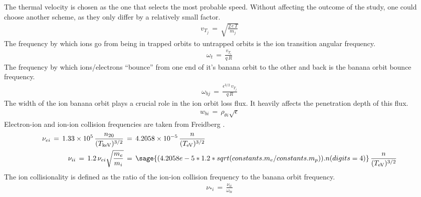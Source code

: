 The thermal velocity is chosen as the one that selects the most probable speed.
Without affecting the outcome of the study, one could choose another scheme, as they only differ by a relatively small factor.
\begin{align} %
	v_{T_j} \,=\, \sqrt{\frac{2 \, e \, T}{m_j}}
		\label{eq:thermal_velocity}
\end{align}
The frequency by which ions go from being in trapped orbits to untrapped orbits is the ion transition angular frequency.
\begin{align} %
	\omega_t \,=\, \frac{v_{T_i}}{q \, R} \label{eq:transition_freq}
\end{align}
The frequency by which ions/electrons ``bounce'' from one end of it's banana orbit to the other and back is the banana orbit bounce frequency.
\begin{align} %
	\omega_{bj} \,=\, \frac{\epsilon^{3/2} \, v_{T_j}}{q \, R}
		\label{eq:banana_bounce_freq}
\end{align}
The width of the ion banana orbit plays a crucial role in the ion orbit loss flux.
It heavily affects the penetration depth of this flux.
\begin{align} %
	w_{bi} \,=\, \rho_{\theta i} \sqrt{\epsilon} \label{eq:banana_width}
\end{align}
Electron-ion and ion-ion collision frequencies are taken from Freidberg \cite{freidberg_plasma_2007}.
\begin{align} %
	\nu_{ei} \,=\, 1.33\times 10^5 \, \frac{n_{20}}{(T_\text{keV})^{3/2}}
		\,&=\, 4.2058\times 10^{-5} \, \frac{n}{(T_\text{eV})^{3/2}}
		\label{eq:nu_ei} \\
	\nu_{ii} \,=\, 1.2 \, \nu_{ei} \sqrt{\frac{m_e}{m_i}} \,&=\,
		\sage{(4.2058e-5* 1.2 * sqrt(constants.m_e / constants.m_p)).n(digits=4)}
		\, \frac{n}{(T_\text{eV})^{3/2}} \label{eq:nu_ii}
\end{align}
The ion collisionality is defined as the ratio of the ion-ion collision frequency to the banana orbit frequency.
\begin{align} %
	\nu_{*i} \,=\, \frac{\nu_{ii}}{\omega_{bi}} \label{eq:collisionality}
\end{align}


